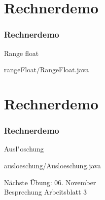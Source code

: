 \documentclass[9pt,german]{beamer}%
\begin{document}
\setcounter{exercise}{7}


\def\stitle{Rechnerdemo}
\section{\stitle}
\begin{frame}[fragile]%
  \frametitle{\stitle}%
\medskip

Range float

{rangeFloat/RangeFloat.java}
\end{frame}



\def\stitle{Rechnerdemo}
\section{\stitle}
\begin{frame}[fragile]%
  \frametitle{\stitle}%
\medskip

Ausl"oschung

{ausloeschung/Ausloeschung.java}
\end{frame}


\setcounter{exercise}{8}


\setcounter{exercise}{9}


\begin{frame}
\centering
\Huge{}
\vspace{2cm}

{\LARGE
N\"achste \"Ubung: 06. November\\
Besprechung Arbeitsblatt 3
}
\end{frame}


\end{document}
